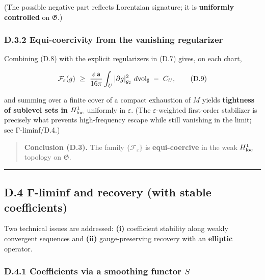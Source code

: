 \documentclass[
]{article}
\numberwithin{equation}{section}
\begin{document}
(The possible negative part reflects Lorentzian signature; it is
\textbf{uniformly controlled} on \(\mathfrak G\).)

\hypertarget{d.3.2-equi-coercivity-from-the-vanishing-regularizer}{%
\subsubsection{D.3.2 Equi-coercivity from the vanishing
regularizer}\label{d.3.2-equi-coercivity-from-the-vanishing-regularizer}}

Combining (D.8) with the explicit regularizers in (D.7) gives, on each
chart,

\[
\mathcal F_\varepsilon(g)\ \ge\ \frac{\varepsilon\,\mathsf a}{16\pi}\int_U |\partial g|^2_{g_\sharp}\ d{\rm vol}_\sharp\ -\ C_U,
\tag{D.9}
\]

and summing over a finite cover of a compact exhaustion of \(M\) yields
\textbf{tightness of sublevel sets in \(H^1_{\rm loc}\)} uniformly in
\(\varepsilon\). (The \(\varepsilon\)-weighted first-order stabilizer is
precisely what prevents high-frequency escape while still vanishing in
the limit; see Γ-liminf/D.4.)

\begin{quote}
\textbf{Conclusion (D.3).} The family \(\{\mathcal F_\varepsilon\}\) is
\textbf{equi-coercive} in the weak \(H^1_{\rm loc}\) topology on
\(\mathfrak G\).
\end{quote}

\begin{center}\rule{0.5\linewidth}{0.5pt}\end{center}

\hypertarget{d.4-ux3b3-liminf-and-recovery-with-stable-coefficients}{%
\subsection{D.4 Γ-liminf and recovery (with stable
coefficients)}\label{d.4-ux3b3-liminf-and-recovery-with-stable-coefficients}}

Two technical issues are addressed: \textbf{(i)} coefficient stability
along weakly convergent sequences and \textbf{(ii)} gauge-preserving
recovery with an \textbf{elliptic} operator.

\hypertarget{d.4.1-coefficients-via-a-smoothing-functor-s}{%
\subsubsection{\texorpdfstring{D.4.1 Coefficients via a smoothing
functor
\(S\)}{D.4.1 Coefficients via a smoothing functor S}}\label{d.4.1-coefficients-via-a-smoothing-functor-s}}
\end{document}
